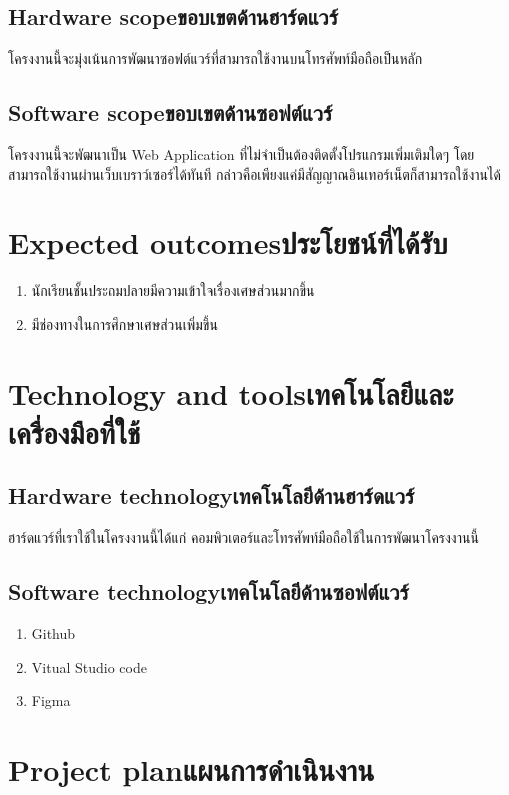 \subsection{\ifenglish Hardware scope\else ขอบเขตด้านฮาร์ดแวร์\fi}
โครงงานนี้จะมุ่งเน้นการพัฒนาซอฟต์แวร์ที่สามารถใช้งานบนโทรศัพท์มือถือเป็นหลัก

\subsection{\ifenglish Software scope\else ขอบเขตด้านซอฟต์แวร์\fi}
โครงงานนี้จะพัฒนาเป็น Web Application ที่ไม่จำเป็นต้องติดตั้งโปรแกรมเพิ่มเติมใดๆ โดยสามารถใช้งานผ่านเว็บเบราว์เซอร์ได้ทันที กล่าวคือเพียงแค่มีสัญญาณอินเทอร์เน็ตก็สามารถใช้งานได้

\section{\ifenglish Expected outcomes\else ประโยชน์ที่ได้รับ\fi}
\begin{enumerate}
    \item นักเรียนชั้นประถมปลายมีความเข้าใจเรื่องเศษส่วนมากขึ้น
    \item มีช่องทางในการศึกษาเศษส่วนเพิ่มขึ้น
\end{enumerate}

\section{\ifenglish Technology and tools\else เทคโนโลยีและเครื่องมือที่ใช้\fi}

\subsection{\ifenglish Hardware technology\else เทคโนโลยีด้านฮาร์ดแวร์\fi}
ฮาร์ดแวร์ที่เราใช้ในโครงงานนี้ได้แก่ คอมพิวเตอร์และโทรศัพท์มือถือใช้ในการพัฒนาโครงงานนี้

\subsection{\ifenglish Software technology\else เทคโนโลยีด้านซอฟต์แวร์\fi}
\begin{enumerate}
    \item Github
    \item Vitual Studio code
    \item Figma
\end{enumerate}

\section{\ifenglish Project plan\else แผนการดำเนินงาน\fi}

